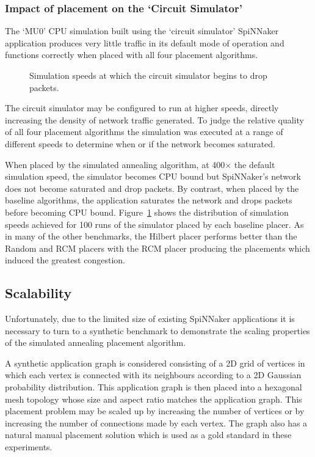 			\subsubsection{Impact of placement on the `Circuit Simulator'}
				
				The `MU0' CPU simulation built using the `circuit simulator' SpiNNaker
				application produces very little traffic in its default mode of
				operation and functions correctly when placed with all four placement
				algorithms.
				
				\begin{figure}
					\center
					
					\caption[Packet dropping in `circuit simulator'.]%
					{Simulation speeds at which the circuit simulator begins to
					drop packets.}
					\label{fig:mu0-saturation}
				\end{figure}
				
				The circuit simulator may be configured to run at higher speeds,
				directly increasing the density of network traffic generated. To judge
				the relative quality of all four placement algorithms the simulation
				was executed at a range of different speeds to determine when or if the
				network becomes saturated.
				
				When placed by the simulated annealing algorithm, at 400$\times$ the
				default simulation speed, the simulator becomes CPU bound but
				SpiNNaker's network does not become saturated and drop packets. By
				contrast, when placed by the baseline algorithms, the application
				saturates the network and drops packets before becoming CPU bound.
				Figure~\ref{fig:mu0-saturation} shows the distribution of simulation
				speeds achieved for 100 runs of the simulator placed by each baseline
				placer. As in many of the other benchmarks, the Hilbert placer performs
				better than the Random and RCM placers with the RCM placer producing
				the placements which induced the greatest congestion.
			
		\subsection{Scalability}
			
			Unfortunately, due to the limited size of existing SpiNNaker applications
			it is necessary to turn to a synthetic benchmark to demonstrate the
			scaling properties of the simulated annealing placement algorithm.
			
			A synthetic application graph is considered consisting of a 2D grid of
			vertices in which each vertex is connected with its neighbours according
			to a 2D Gaussian probability distribution. This application graph is then
			placed into a hexagonal mesh topology whose size and aspect ratio matches
			the application graph. This placement problem may be scaled up by
			increasing the number of vertices or by increasing the number of
			connections made by each vertex. The graph also has a natural manual
			placement solution which is used as a gold standard in these experiments.
			
